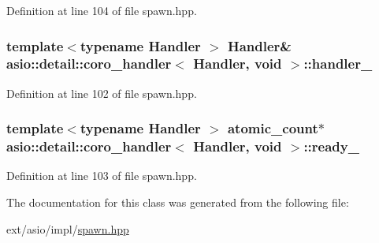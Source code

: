 Definition at line 104 of file spawn.\+hpp.

\hypertarget{classasio_1_1detail_1_1coro__handler_3_01_handler_00_01void_01_4_a207d28691946bae82598c715e8aa907c}{}
\subsubsection[{handler\+\_\+}]{\setlength{\rightskip}{0pt plus 5cm}template$<$typename Handler $>$ Handler\& {\bf asio\+::detail\+::coro\+\_\+handler}$<$ Handler, void $>$\+::handler\+\_\+}\label{classasio_1_1detail_1_1coro__handler_3_01_handler_00_01void_01_4_a207d28691946bae82598c715e8aa907c}


Definition at line 102 of file spawn.\+hpp.

\hypertarget{classasio_1_1detail_1_1coro__handler_3_01_handler_00_01void_01_4_aa491514a709f2438ba2994b0fb4304ad}{}
\subsubsection[{ready\+\_\+}]{\setlength{\rightskip}{0pt plus 5cm}template$<$typename Handler $>$ {\bf atomic\+\_\+count}$\ast$ {\bf asio\+::detail\+::coro\+\_\+handler}$<$ Handler, void $>$\+::ready\+\_\+}\label{classasio_1_1detail_1_1coro__handler_3_01_handler_00_01void_01_4_aa491514a709f2438ba2994b0fb4304ad}


Definition at line 103 of file spawn.\+hpp.



The documentation for this class was generated from the following file\+:\begin{DoxyCompactItemize}
\item 
ext/asio/impl/\hyperlink{impl_2spawn_8hpp}{spawn.\+hpp}\end{DoxyCompactItemize}
